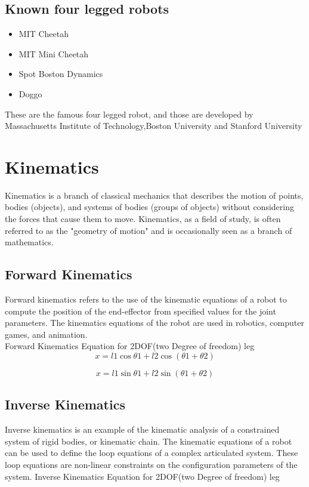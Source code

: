 \documentclass [a4paper ] {report}
\begin{document}
\subsection{Known four legged robots}
\begin{itemize}
\item MIT Cheetah
\item MIT Mini Cheetah 
\item Spot Boston Dynamics
\item Doggo 
\end{itemize}
These are the famous four legged robot, and those are developed by Massachusetts Institute of Technology,Boston University and Stanford University

\newpage

\section{Kinematics}

Kinematics is a branch of classical mechanics that describes the motion of points, bodies (objects), and systems of bodies (groups of objects) without considering the forces that cause them to move. Kinematics, as a field of study, is often referred to as the "geometry of motion" and is occasionally seen as a branch of mathematics.
\subsection{Forward Kinematics}
Forward kinematics refers to the use of the kinematic equations of a robot to compute the position of the end-effector from specified values for the joint parameters. The kinematics equations of the robot are used in robotics, computer games, and animation.\\
Forward Kinematics Equation for 2DOF(two Degree of freedom) leg\\
\begin{equation}
x=l1\cos\theta1+l2\cos(\theta1+\theta2)
\end{equation}

\begin{equation}
x=l1\sin\theta1+l2\sin(\theta1+\theta2)
\end{equation}

\subsection{Inverse Kinematics}
Inverse kinematics is an example of the kinematic analysis of a constrained system of rigid bodies, or kinematic chain. The kinematic equations of a robot can be used to define the loop equations of a complex articulated system. These loop equations are non-linear constraints on the configuration parameters of the system.
Inverse Kinematics Equation for 2DOF(two Degree of freedom) leg\\
\end{document}
